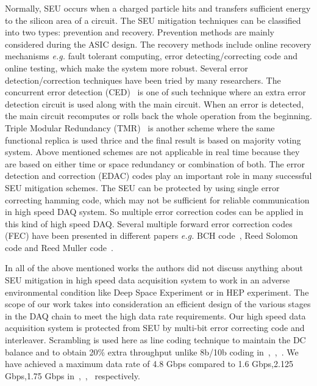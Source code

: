 \documentclass[10pt, conference, compsocconf]{IEEEtran}
\begin{document}
\par
Normally, SEU occurs when a charged particle hits and transfers sufficient energy to the silicon area of a circuit.  
The SEU mitigation techniques can be classified into two types: prevention and recovery. Prevention methods are mainly considered during the ASIC design. The recovery methods include online recovery mechanisms \textit{e.g.} fault tolerant computing, error detecting/correcting code and online testing, which make the system more robust. Several error detection/correction techniques have been tried by many researchers. The concurrent error detection (CED)~\cite{Siewiorek:CED} is one of such technique where an extra error detection circuit is used along with the main circuit. When an error is detected, the main circuit recomputes or rolls back the whole operation from the beginning. Triple Modular Redundancy (TMR)~\cite{TMR:IeeeTran:NuclrPhy} is another scheme where the same functional replica is used thrice and the final result is based on majority voting system. Above mentioned schemes are not applicable in real time because they are based on either time or space redundancy or combination of both. The error detection and correction (EDAC) codes play an important role in many successful SEU mitigation schemes. The SEU can be protected by using single error correcting hamming code, which may not be sufficient for reliable communication in high speed DAQ system. So multiple error correction codes can be applied in this kind of high speed DAQ. Several multiple forward error correction codes (FEC) have been presented in different papers \textit{e.g.} BCH code~\cite{chien:search}, Reed Solomon code and Reed Muller code~\cite{ Varghese:multibit:error}. \par
In all of the above mentioned works the authors did not discuss anything about SEU mitigation in high speed data acquisition system to work in an adverse environmental condition like Deep Space Experiment or in HEP experiment. The scope of our work takes into consideration an efficient design of the various stages in the DAQ chain to meet the high data  rate requirements. Our high speed data acquisition system is protected from SEU by multi-bit error correcting code and interleaver. Scrambling is used here as line coding technique to maintain the DC balance and to obtain 20\% extra throughput unlike 8b/10b coding in~\cite{Minami:ieeetran:2011},~\cite{kadric:socc:2012},~\cite{Liu:i2mtc:2013:X}. We have achieved a maximum data rate of 4.8 Gbps compared to 1.6 Gbps,2.125 Gbps,1.75 Gbps in~\cite{Minami:ieeetran:2011},~\cite{Liu:i2mtc:2013:X},~\cite{haoxu:nss:2007:XX} respectively.
\end{document}
